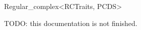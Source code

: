\begin{ccRefClass}{Regular_complex<RCTraits, PCDS>}

TODO: this documentation is not finished.

\end{ccRefClass}
